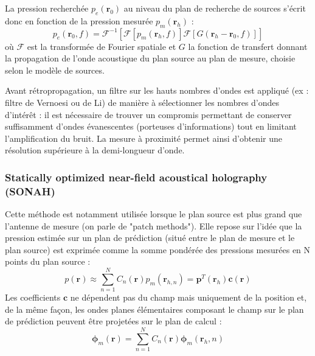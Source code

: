 La pression recherchée $p_e(\bm{r}_0)$ au niveau du plan de recherche de sources s'écrit donc en fonction de la pression mesurée $p_m(\bm{r}_h)$ : 
\begin{equation}
	p_e(\bm{r}_0,f) = \mathcal{F}^{-1} \left[ \mathcal{F}\left[ p_m(\bm{r}_h,f)\right]\mathcal{F}\left[G(\bm{r}_h-\bm{r}_0 ,f)\right]\right]
\end{equation}
où $\mathcal{F}$ est  la transformée de Fourier spatiale et $G$ la fonction de transfert donnant la propagation de l'onde acoustique du plan source au plan de mesure, choisie selon le modèle de sources.

  Avant rétropropagation, un filtre sur les hauts nombres d'ondes est appliqué (ex : filtre de Vernoesi ou de Li) de manière à sélectionner les nombres d'ondes d'intérêt : il est nécessaire de trouver un compromis permettant de conserver suffisamment d'ondes évanescentes (porteuses d'informations) tout en limitant l'amplification du bruit. La mesure à proximité permet ainsi d'obtenir une résolution supérieure à la demi-longueur d'onde.\\
  

 
\subsubsection{Statically optimized near-field acoustical holography (SONAH)}
 
Cette méthode est notamment utilisée lorsque le plan source est plus grand que l'antenne de mesure (on parle de "patch methods"). Elle repose sur l'idée que la pression estimée sur un plan de prédiction (situé entre le plan de mesure et le plan source) est exprimée comme la somme pondérée des pressions mesurées en N points du plan source \citep{Hald2009} : 
\begin{equation}
	p(\bm{r})\approx \sum_{n=1}^{N} C_n(\bm{r})p_m(\bm{r}_{h,n}) = \bm{p}^T(\bm{r}_h)\bm{c}(\bm{r})
\end{equation} 
 Les coefficients $\bm{c}$ ne dépendent pas du champ mais uniquement de la position et, de la même façon, les ondes planes élémentaires composant le champ sur le plan de prédiction peuvent être projetées sur le plan de calcul : 
 \begin{equation}
\bm{\phi}_m(\bm{r}) = \sum_{n=1}^{N} C_n(\bm{r}) \bm{\phi}_m(\bm{r}_h,n)
 \end{equation}
 
